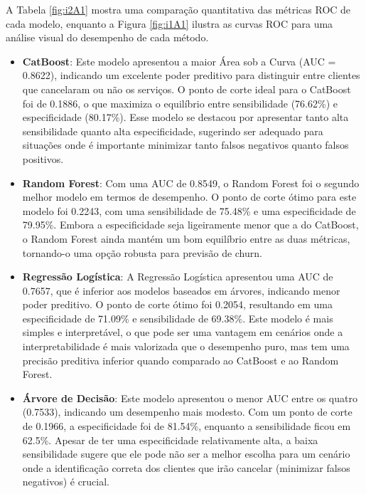 \documentclass[a4paper,12pt]{article}[abntex2]
\begin{document}
A Tabela \ref{fig:i2A1} mostra uma comparação quantitativa das métricas ROC de cada modelo, enquanto a Figura \ref{fig:i1A1} ilustra as curvas ROC para uma análise visual do desempenho de cada método.

\begin{itemize}
    \item \textbf{CatBoost}: Este modelo apresentou a maior Área sob a Curva (AUC = 0.8622), indicando um excelente poder preditivo para distinguir entre clientes que cancelaram ou não os serviços. O ponto de corte ideal para o CatBoost foi de 0.1886, o que maximiza o equilíbrio entre sensibilidade (76.62\%) e especificidade (80.17\%). Esse modelo se destacou por apresentar tanto alta sensibilidade quanto alta especificidade, sugerindo ser adequado para situações onde é importante minimizar tanto falsos negativos quanto falsos positivos.

    \item \textbf{Random Forest}: Com uma AUC de 0.8549, o Random Forest foi o segundo melhor modelo em termos de desempenho. O ponto de corte ótimo para este modelo foi 0.2243, com uma sensibilidade de 75.48\% e uma especificidade de 79.95\%. Embora a especificidade seja ligeiramente menor que a do CatBoost, o Random Forest ainda mantém um bom equilíbrio entre as duas métricas, tornando-o uma opção robusta para previsão de churn. 

    \item \textbf{Regressão Logística}: A Regressão Logística apresentou uma AUC de 0.7657, que é inferior aos modelos baseados em árvores, indicando menor poder preditivo. O ponto de corte ótimo foi 0.2054, resultando em uma especificidade de 71.09\% e sensibilidade de 69.38\%. Este modelo é mais simples e interpretável, o que pode ser uma vantagem em cenários onde a interpretabilidade é mais valorizada que o desempenho puro, mas tem uma precisão preditiva inferior quando comparado ao CatBoost e ao Random Forest.

    \item \textbf{Árvore de Decisão}: Este modelo apresentou o menor AUC entre os quatro (0.7533), indicando um desempenho mais modesto. Com um ponto de corte de 0.1966, a especificidade foi de 81.54\%, enquanto a sensibilidade ficou em 62.5\%. Apesar de ter uma especificidade relativamente alta, a baixa sensibilidade sugere que ele pode não ser a melhor escolha para um cenário onde a identificação correta dos clientes que irão cancelar (minimizar falsos negativos) é crucial.
\end{itemize}
\end{document}
